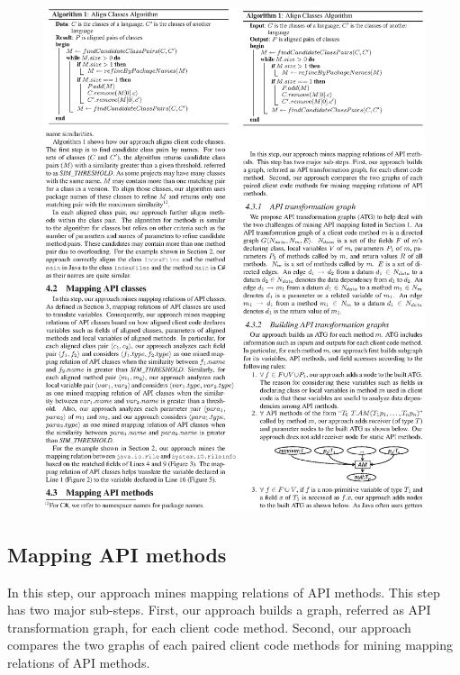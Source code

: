 \begin{figure}[t]
\centering
\includegraphics[scale=1,clip]{figure/algorithm1.eps}
\vspace*{-6ex}
\end{figure}

\subsection{Mapping API methods}
\label{sec:approach:mappingmethods}

In this step, our approach mines mapping relations of API methods.
This step has two major sub-steps. First, our approach builds a graph, referred
as API transformation graph, for each client code
method. Second, our approach compares the two graphs of each paired
client code methods for mining mapping relations of API methods.

